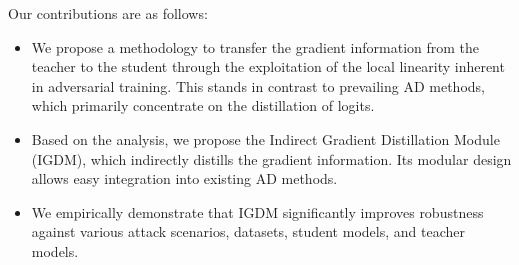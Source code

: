 Our contributions are as follows:
\begin{itemize}
\item We propose a methodology to transfer the gradient information from the teacher to the student through the exploitation of the local linearity inherent in adversarial training.
This stands in contrast to prevailing AD methods, which primarily concentrate on the distillation of logits.
\item Based on the analysis, we propose the Indirect Gradient Distillation Module (IGDM), which indirectly distills the gradient information. Its modular design allows easy integration into existing AD methods.
\item We empirically demonstrate that IGDM significantly improves robustness against various attack scenarios, datasets, student models, and teacher models.

\end{itemize}



